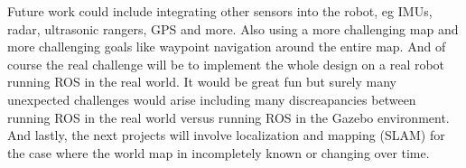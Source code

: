 \documentclass[10pt,journal,compsoc]{IEEEtran}
\begin{document}
Future work could include integrating other sensors into the robot, eg IMUs, radar, ultrasonic rangers, GPS and more. Also using a more challenging map and more challenging goals like waypoint navigation around the entire map. And of course the real challenge will be to implement the whole design on a real robot running ROS in the real world. It would be great fun but surely many unexpected challenges would arise including many discreapancies between running ROS in the real world versus running ROS in the Gazebo environment. And lastly, the next projects will involve localization and mapping (SLAM) for the case where the world map in incompletely known or changing over time.
\end{document}
